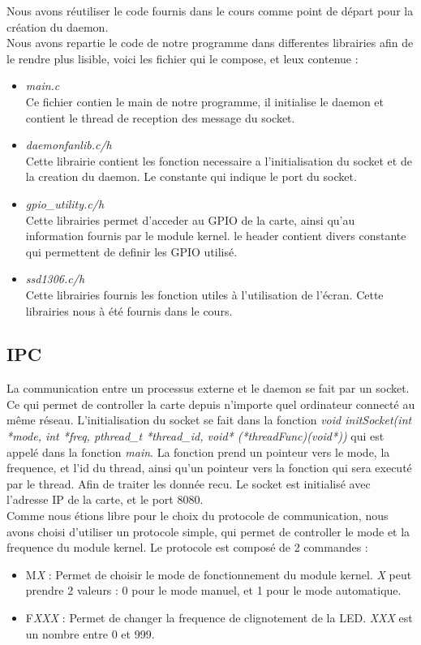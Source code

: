 \documentclass[
	a4paper, %
	10pt, %
]{CSUniSchoolLabReport}
\begin{document}
Nous avons réutiliser le code fournis dans le cours comme point de départ pour la création du daemon. \\

Nous avons repartie le code de notre programme dans differentes librairies afin de le rendre plus lisible, voici les fichier qui le compose, et leux contenue : \\
\begin{itemize}
	\item \textit{main.c}\\
	Ce fichier contien le main de notre programme, il initialise le daemon et contient le thread de reception des message du socket.
	\item \textit{daemonfanlib.c/h}\\
	Cette librairie contient les fonction necessaire a l'initialisation du socket et de la creation du daemon. Le constante qui indique le port du socket.
	\item \textit{gpio\_utility.c/h}\\
	Cette librairies permet d'acceder au GPIO de la carte, ainsi qu'au information fournis par le module kernel. le header contient divers constante qui permettent de definir les GPIO utilisé.
	\item \textit{ssd1306.c/h}\\
	Cette librairies fournis les fonction utiles à l'utilisation de l'écran. Cette librairies nous à été fournis dans le cours.

\end{itemize}
\subsection{IPC}\label{IPC}
La communication entre un processus externe et le daemon se fait par un socket. 
Ce qui permet de controller la carte depuis n'importe quel ordinateur connecté au même réseau. 
L'initialisation du socket se fait dans la fonction \textit{void initSocket(int *mode, int *freq, pthread\_t *thread\_id, void* (*threadFunc)(void*))} qui est appelé dans la fonction \textit{main}.
La fonction prend un pointeur vers le mode, la frequence, et l'id du thread, ainsi qu'un pointeur vers la fonction qui sera executé par le thread. Afin de traiter les donnée recu.
Le socket est initialisé avec l'adresse IP de la carte, et le port 8080. \\

Comme nous étions libre pour le choix du protocole de communication, nous avons choisi d'utiliser un protocole simple, qui permet de controller le mode et la frequence du module kernel.
Le protocole est composé de 2 commandes : \\
\begin{itemize}
	\item M\textit{X} : Permet de choisir le mode de fonctionnement du module kernel. \textit{X} peut prendre 2 valeurs : 0 pour le mode manuel, et 1 pour le mode automatique.
	\item F\textit{XXX} : Permet de changer la frequence de clignotement de la LED. \textit{XXX} est un nombre entre 0 et 999.
\end{itemize}
\end{document}
